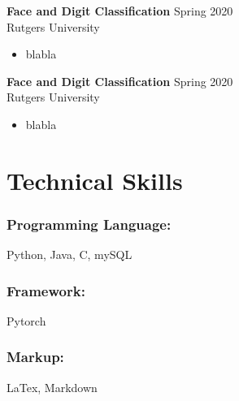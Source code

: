 \documentclass{article}
\begin{document}
\noindent \textbf{Face and Digit Classification}
\hfill{Spring 2020}\\
Rutgers University
\begin{itemize}
  \itemsep0em
  \item blabla
\end{itemize}

\noindent \textbf{Face and Digit Classification}
\hfill{Spring 2020}\\
Rutgers University
\begin{itemize}
  \itemsep0em
  \item blabla
\end{itemize}

\section{Technical Skills}

\subsubsection{Programming Language:}

Python, Java, C, mySQL

\subsubsection{Framework:}

Pytorch

\subsubsection{Markup:}

LaTex, Markdown
\end{document}

